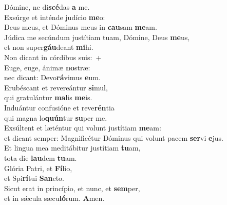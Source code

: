 \oddverse Dómine, ne di\textbf{scé}das \textbf{a} me.\\
\evenverse Exsúrge et inténde judício \textbf{me}o:~\*\\
\evenverse Deus meus, et Dóminus meus in \textbf{cau}sam \textbf{me}am.\\
\oddverse Júdica me secúndum justítiam tuam, Dómine, Deus \textbf{me}us,~\*\\
\oddverse et non super\textbf{gáu}deant \textbf{mi}hi.\\
\evenverse Non dicant in córdibus suis:~+\\
\evenverse  Euge, euge, ánimæ \textbf{no}stræ:~\*\\
\evenverse nec dicant: Devo\textbf{rá}vimus \textbf{e}um.\\
\oddverse Erubéscant et revereántur \textbf{si}mul,~\*\\
\oddverse qui gratulántur \textbf{ma}lis \textbf{me}is.\\
\evenverse Induántur confusióne et reve\textbf{rén}tia~\*\\
\evenverse qui magna lo\textbf{quún}tur \textbf{su}per me.\\
\oddverse Exsúltent et læténtur qui volunt justítiam \textbf{me}am:~\*\\
\oddverse et dicant semper: Magnificétur Dóminus qui volunt pacem \textbf{ser}vi \textbf{e}jus.\\
\evenverse Et lingua mea meditábitur justítiam \textbf{tu}am,~\*\\
\evenverse tota die \textbf{lau}dem \textbf{tu}am.\\
\oddverse Glória Patri, et \textbf{Fí}lio,~\*\\
\oddverse et Spi\textbf{rí}tui \textbf{San}cto.\\
\evenverse Sicut erat in princípio, et nunc, et \textbf{sem}per,~\*\\
\evenverse et in sǽcula sæcu\textbf{ló}rum. \textbf{A}men.\\

